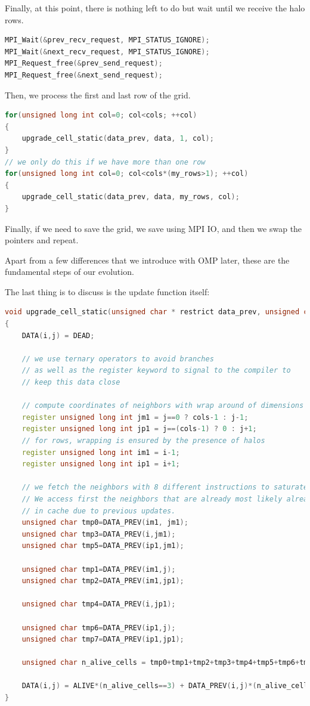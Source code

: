 \documentclass{report}
\begin{document}
Finally, at this point, there is nothing left to do but wait until we receive 
the halo rows.

\begin{lstlisting}[language=C++]
MPI_Wait(&prev_recv_request, MPI_STATUS_IGNORE);
MPI_Wait(&next_recv_request, MPI_STATUS_IGNORE);
MPI_Request_free(&prev_send_request);
MPI_Request_free(&next_send_request);
\end{lstlisting}

Then, we process the first and last row of the grid.

\begin{lstlisting}[language=C++]
for(unsigned long int col=0; col<cols; ++col)
{
    upgrade_cell_static(data_prev, data, 1, col);
}
// we only do this if we have more than one row 
for(unsigned long int col=0; col<cols*(my_rows>1); ++col)
{
    upgrade_cell_static(data_prev, data, my_rows, col);
}
\end{lstlisting}

Finally, if we need to save the grid, we save using MPI IO, and then we swap the 
pointers and repeat.

Apart from a few differences that we introduce with OMP later, these are the 
fundamental steps of our evolution.

The last thing is to discuss is the update function itself:

\begin{lstlisting}[language=C++]
void upgrade_cell_static(unsigned char * restrict data_prev, unsigned char * restrict data, unsigned long int i, unsigned long int j)
{
    DATA(i,j) = DEAD;

    // we use ternary operators to avoid branches
    // as well as the register keyword to signal to the compiler to 
    // keep this data close

    // compute coordinates of neighbors with wrap around of dimensions
    register unsigned long int jm1 = j==0 ? cols-1 : j-1;
    register unsigned long int jp1 = j==(cols-1) ? 0 : j+1;
    // for rows, wrapping is ensured by the presence of halos
    register unsigned long int im1 = i-1;
    register unsigned long int ip1 = i+1;
    
    // we fetch the neighbors with 8 different instructions to saturate pipelines.
    // We access first the neighbors that are already most likely already 
    // in cache due to previous updates.
    unsigned char tmp0=DATA_PREV(im1, jm1);
    unsigned char tmp3=DATA_PREV(i,jm1);
    unsigned char tmp5=DATA_PREV(ip1,jm1);

    unsigned char tmp1=DATA_PREV(im1,j);
    unsigned char tmp2=DATA_PREV(im1,jp1);

    unsigned char tmp4=DATA_PREV(i,jp1);

    unsigned char tmp6=DATA_PREV(ip1,j);
    unsigned char tmp7=DATA_PREV(ip1,jp1);

    unsigned char n_alive_cells = tmp0+tmp1+tmp2+tmp3+tmp4+tmp5+tmp6+tmp7;

    DATA(i,j) = ALIVE*(n_alive_cells==3) + DATA_PREV(i,j)*(n_alive_cells==2);
}
\end{lstlisting}
\end{document}
